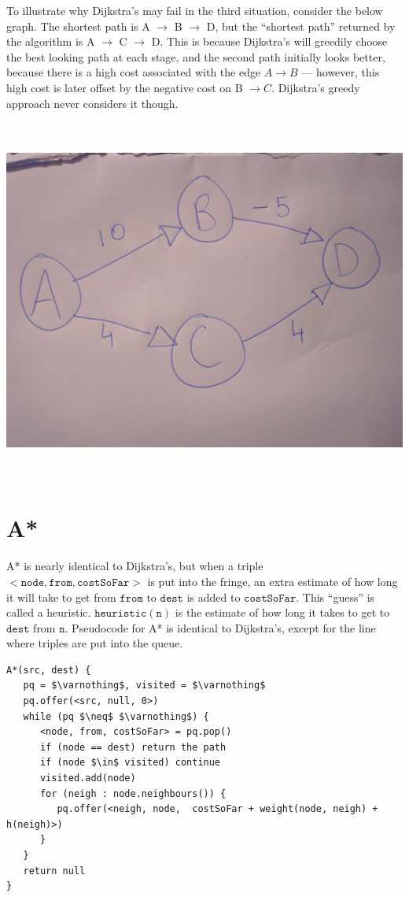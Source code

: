 \documentclass[a4paper,12pt]{article}
\newcommand{\kwa}[1]{\mathtt{#1}}
\begin{document}
\noindent
To illustrate why Dijkstra's may fail in the third situation, consider the below graph. The shortest path is A $\rightarrow$ B $\rightarrow$ D, but the ``shortest path'' returned by the algorithm is A $\rightarrow$ C $\rightarrow$ D. This is because Dijkstra's will greedily choose the best looking path at each stage, and the second path initially looks better, because there is a high cost associated with the edge $A \rightarrow B$ --- however, this high cost is later offset by the negative cost on B $\rightarrow C$. Dijkstra's greedy approach never considers it though.

~\\~\\
\includegraphics[scale=0.1]{fig_negativeweights}
~\\~\\

\section{A*}

A* is nearly identical to Dijkstra's, but when a triple $\kwa{<node, from, costSoFar>}$ is put into the fringe, an extra estimate of how long it will take to get from $\kwa{from}$ to $\kwa{dest}$ is added to $\kwa{costSoFar}$. This ``guess'' is called a heuristic. $\kwa{heuristic(n)}$ is the estimate of how long it takes to get to $\kwa{dest}$ from $\kwa{n}$. Pseudocode for A* is identical to Dijkstra's, except for the line where triples are put into the queue.

\begin{lstlisting}
A*(src, dest) {
   pq = $\varnothing$, visited = $\varnothing$
   pq.offer(<src, null, 0>)
   while (pq $\neq$ $\varnothing$) {
      <node, from, costSoFar> = pq.pop()
      if (node == dest) return the path
      if (node $\in$ visited) continue
      visited.add(node)
      for (neigh : node.neighbours()) {
         pq.offer(<neigh, node,  costSoFar + weight(node, neigh) + h(neigh)>)
      }
   }
   return null
}
\end{lstlisting}
\end{document}
